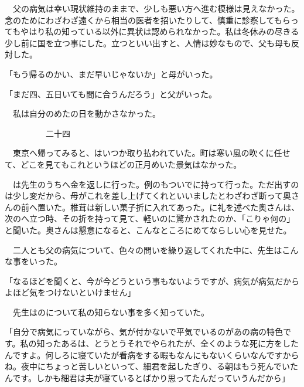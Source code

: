 \documentclass[a4j,onecolumn]{tarticle}
\begin{document}
　父の病気は幸い現状維持のままで、\hbox{}少しも悪い方へ進む模様は見えなかった。\hbox{}念のためにわざわざ遠くから相当の医者を招いたりして、\hbox{}慎重に診察してもらってもやはり私の知っている以外に異状は認められなかった。\hbox{}私は冬休みの尽きる少し前に国を立つ事にした。\hbox{}立つといい出すと、\hbox{}人情は妙なもので、\hbox{}父も母も反対した。\hbox{}\par{}
「もう帰るのかい、\hbox{}まだ早いじゃないか」と母がいった。\hbox{}\par{}
「まだ四、\hbox{}五日いても間に合うんだろう」と父がいった。\hbox{}\par{}
　私は自分のめたの日を動かさなかった。\hbox{}\par{}\par{}　　　　　二十四
\par{}
　東京へ帰ってみると、\hbox{}はいつか取り払われていた。\hbox{}町は寒い風の吹くに任せて、\hbox{}どこを見てもこれというほどの正月めいた景気はなかった。\hbox{}\par{}
　は先生のうちへ金を返しに行った。\hbox{}例のもついでに持って行った。\hbox{}ただ出すのは少し変だから、\hbox{}母がこれを差し上げてくれといいましたとわざわざ断って奥さんの前へ置いた。\hbox{}椎茸は新しい菓子折に入れてあった。\hbox{}に礼を述べた奥さんは、\hbox{}次のへ立つ時、\hbox{}その折を持って見て、\hbox{}軽いのに驚かされたのか、\hbox{}「こりゃ何の」と聞いた。\hbox{}奥さんは懇意になると、\hbox{}こんなところにめてならしい心を見せた。\hbox{}\par{}
　二人とも父の病気について、\hbox{}色々の問いを繰り返してくれた中に、\hbox{}先生はこんな事をいった。\hbox{}\par{}
「なるほどを聞くと、\hbox{}今が今どうという事もないようですが、\hbox{}病気が病気だからよほど気をつけないといけません」\par{}
　先生はのについて私の知らない事を多く知っていた。\hbox{}\par{}
「自分で病気にっていながら、\hbox{}気が付かないで平気でいるのがあの病の特色です。\hbox{}私の知ったあるは、\hbox{}とうとうそれでやられたが、\hbox{}全くのような死に方をしたんですよ。\hbox{}何しろに寝ていたが看病をする暇もなんにもないくらいなんですからね。\hbox{}夜中にちょっと苦しいといって、\hbox{}細君を起したぎり、\hbox{}る朝はもう死んでいたんです。\hbox{}しかも細君は夫が寝ているとばかり思ってたんだっていうんだから」\par{}
\end{document}
